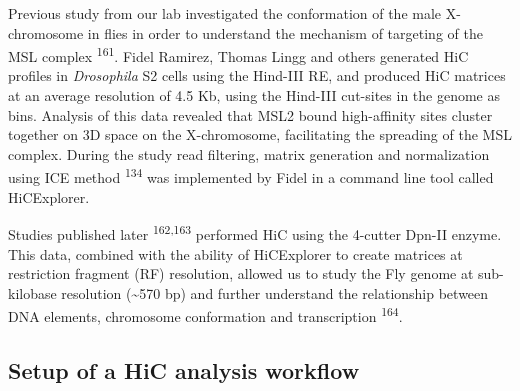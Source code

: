 \documentclass[11pt,twoside]{MPIthesis}
\theoremstyle{definition}
\theoremstyle{definition}
\theoremstyle{definition}
\theoremstyle{remark}
\begin{document}
Previous study from our lab investigated the conformation of the male
X-chromosome in flies in order to understand the mechanism of targeting
of the MSL complex \textsuperscript{161}. Fidel Ramirez, Thomas Lingg
and others generated HiC profiles in \emph{Drosophila} S2 cells using
the Hind-III RE, and produced HiC matrices at an average resolution of
4.5 Kb, using the Hind-III cut-sites in the genome as bins. Analysis of
this data revealed that MSL2 bound high-affinity sites cluster together
on 3D space on the X-chromosome, facilitating the spreading of the MSL
complex. During the study read filtering, matrix generation and
normalization using ICE method \textsuperscript{134} was implemented by
Fidel in a command line tool called HiCExplorer.

Studies published later \textsuperscript{162,163} performed HiC using
the 4-cutter Dpn-II enzyme. This data, combined with the ability of
HiCExplorer to create matrices at restriction fragment (RF) resolution,
allowed us to study the Fly genome at sub-kilobase resolution
(\textasciitilde{}570 bp) and further understand the relationship
between DNA elements, chromosome conformation and transcription
\textsuperscript{164}.

\subsection{Setup of a HiC analysis
workflow}\label{setup-of-a-hic-analysis-workflow}
\end{document}
